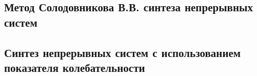 \subsection{Метод Солодовникова В.В. синтеза непрерывных 	систем}

\subsection{Синтез непрерывных систем с использованием 	показателя колебательности}
